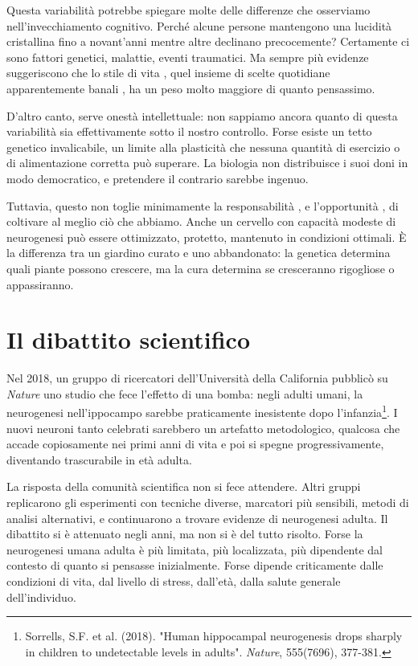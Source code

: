 Questa variabilità potrebbe spiegare molte delle differenze che osserviamo nell'invecchiamento cognitivo. Perché alcune persone mantengono una lucidità cristallina fino a novant'anni mentre altre declinano precocemente? Certamente ci sono fattori genetici, malattie, eventi traumatici. Ma sempre più evidenze suggeriscono che lo stile di vita , quel insieme di scelte quotidiane apparentemente banali , ha un peso molto maggiore di quanto pensassimo.

D'altro canto, serve onestà intellettuale: non sappiamo ancora quanto di questa variabilità sia effettivamente sotto il nostro controllo. Forse esiste un tetto genetico invalicabile, un limite alla plasticità che nessuna quantità di esercizio o di alimentazione corretta può superare. La biologia non distribuisce i suoi doni in modo democratico, e pretendere il contrario sarebbe ingenuo.

Tuttavia, questo non toglie minimamente la responsabilità , e l'opportunità , di coltivare al meglio ciò che abbiamo. Anche un cervello con capacità modeste di neurogenesi può essere ottimizzato, protetto, mantenuto in condizioni ottimali. È la differenza tra un giardino curato e uno abbandonato: la genetica determina quali piante possono crescere, ma la cura determina se cresceranno rigogliose o appassiranno.

\section{Il dibattito scientifico}

Nel 2018, un gruppo di ricercatori dell'Università della California pubblicò su \textit{Nature} uno studio che fece l'effetto di una bomba: negli adulti umani, la neurogenesi nell'ippocampo sarebbe praticamente inesistente dopo l'infanzia\footnote{Sorrells, S.F. et al. (2018). "Human hippocampal neurogenesis drops sharply in children to undetectable levels in adults". \textit{Nature}, 555(7696), 377-381.}. I nuovi neuroni tanto celebrati sarebbero un artefatto metodologico, qualcosa che accade copiosamente nei primi anni di vita e poi si spegne progressivamente, diventando trascurabile in età adulta.

La risposta della comunità scientifica non si fece attendere. Altri gruppi replicarono gli esperimenti con tecniche diverse, marcatori più sensibili, metodi di analisi alternativi, e continuarono a trovare evidenze di neurogenesi adulta. Il dibattito si è attenuato negli anni, ma non si è del tutto risolto. Forse la neurogenesi umana adulta è più limitata, più localizzata, più dipendente dal contesto di quanto si pensasse inizialmente. Forse dipende criticamente dalle condizioni di vita, dal livello di stress, dall'età, dalla salute generale dell'individuo.

